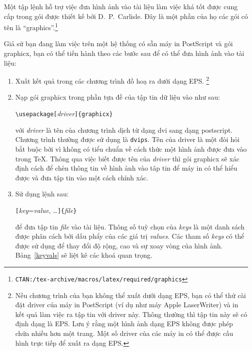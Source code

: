 Một tập lệnh hỗ trợ việc đưa hình ảnh vào tài liệu làm việc khá tốt được cung cấp trong gói  được thiết kế bởi D.~P.~Carlisle. Đây là một phần của họ các gói có tên là ``graphics''.\footnote{\texttt{CTAN:/tex-archive/macros/latex/required/graphics}}

\newpage
Giả sử bạn đang làm việc trên một hệ thống có sẵn máy in PostScript và gói \textsf{graphicx}, bạn có thể tiến hành theo các bước sau để có thể đưa hình ảnh vào tài liệu:
\begin{enumerate}
\item Xuất kết quả trong các chương trình đồ hoạ ra dưới dạng EPS.%
\footnote{Nếu chương trình của bạn không thể xuất dưới dạng EPS, bạn có thể thử cài đặt driver của máy in PostScript (ví dụ như máy Apple LaserWriter) và in kết quả làm việc ra tập tin với driver này. Thông thường thì tập tin này sẽ có định dạng là EPS. Lưu ý rằng một hình ảnh dạng EPS không được phép chứa nhiều hơn một trang. Một số driver của các máy in có thể được cấu hình trực tiếp để xuất ra dạng EPS.}
%
\item Nạp gói \textsf{graphicx} trong phần tựa đề của tập tin dữ liệu vào như sau:
\begin{lscommand}
\verb|\usepackage[|\emph{driver}\verb|]{graphicx}|
\end{lscommand}
với \emph{driver} là tên của chương trình dịch từ dạng dvi sang dạng postscript. Chương trình thường được sử dụng là \texttt{dvips}. Tên của driver là một đòi hỏi bắt buộc bởi vì không có tiểu chuẩn về cách thức một hình ảnh được đưa vào trong \TeX{}. Thông qua việc biết được tên của \emph{driver} thì gói \textsf{graphicx} sẽ xác định cách để chèn thông tin về hình ảnh vào tâp tin  để máy in có thể hiểu được và đưa tập tin  vào một cách chính xác.

\item Sử dụng lệnh sau:
\begin{lscommand}
\verb|[|\emph{key}=\emph{value}, \ldots\verb|]{|\emph{file}\verb|}|
\end{lscommand}
để đưa tập tin \emph{file} vào tài liệu. Thông số tuỳ chọn của \emph{keys} là một danh sách được phân cách bởi dấu phẩy của các giá trị \emph{values}. Các tham số \emph{keys} có thể được sử dụng để thay đổi độ rộng, cao và sự xoay vòng của hình ảnh. Bảng~\ref{keyvals} sẽ liệt kê các khoá quan trọng.
\end{enumerate}

